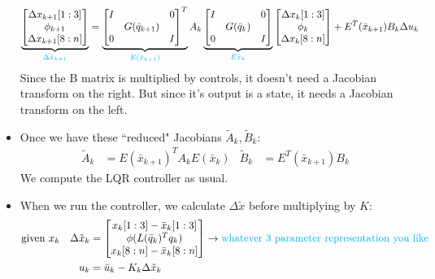 \documentclass[11pt]{article}
\begin{document}
\begin{itemize}
\begin{align*}
    \underbrace{\begin{bmatrix}
        \Delta x_{k+1}[1:3]
        \\
        \phi_{k+1}
        \\
        \Delta x_{k+1}[8:n]
    \end{bmatrix}}_{\textcolor{cyan}{\Delta\tilde{x}_{k+1}}}
    &=
    \underbrace{\begin{bmatrix}
        I & & 0 \\
        & G(\bar{q}_{k+1}) & \\
        0 & & I
    \end{bmatrix}^T}_{\textcolor{cyan}{E(\bar{x}_{k+1})}} A_k
    \underbrace{\begin{bmatrix}
        I & & 0 \\
        & G(\bar{q}_k) & \\
        0 & & I
    \end{bmatrix}}_{\textcolor{cyan}{E{\bar{x}_k}}}
    \begin{bmatrix}
        \Delta x_k[1:3] \\
        \phi_k \\
        \Delta x_k[8:n]
    \end{bmatrix}
    + E^T(\bar{x}_{k+1})B_k\Delta u_k
\end{align*}
Since the B matrix is multiplied by controls, it doesn't need a Jacobian transform on the right. But since it's output is a state, it needs a Jacobian transform on the left.
\item Once we have these ``reduced" Jacobians $\tilde{A}_k, \tilde{B}_k$:
\begin{align*}
    \tilde{A}_k &= E(\bar{x}_{k+1})^TA_kE(\bar{x}_k) & \tilde{B}_k&= E^T(\bar{x}_{k+1})B_k
\end{align*}
We compute the LQR controller as usual.
\item When we run the controller, we calculate $\Delta \tilde{{x}}$ before multiplying by $K$:
\begin{align*}
    \text{given } x_k& & \Delta\tilde{x}_k&= \begin{bmatrix}
        x_k[1:3] - \bar{x}_k[1:3] \\
        \phi(L(\bar{q}_k)^T q_k) \\
        x_k[8:n] - \bar{x}_k[8:n]
    \end{bmatrix}\rightarrow{\textcolor{cyan}{\text{whatever 3 parameter representation you like}}}
    \\
   && u_k &= \bar{u}_k - K_k\Delta\tilde{x}_k
\end{align*}
\end{itemize}
\end{document}
